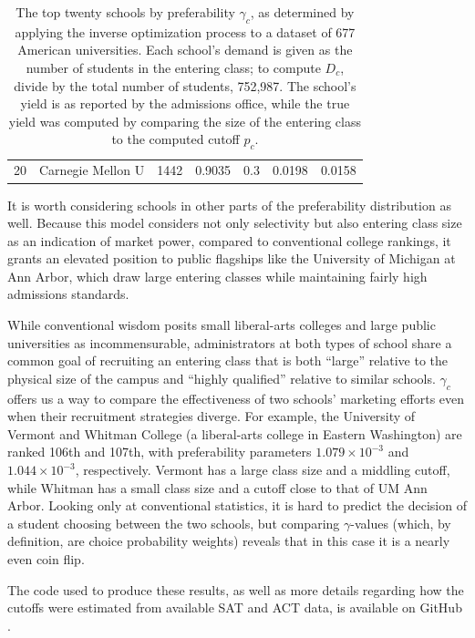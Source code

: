 \documentclass[12pt]{article}
\theoremstyle{definition}
\begin{document}
\begin{table}[]
\begin{tabular}{r|l|r|l|l|l|l}
20                                 & Carnegie Mellon U                     & 1442                                 & 0.9035                  & 0.3            & 0.0198              & 0.0158                             
\end{tabular}
\caption{\label{tab:US-inverse-optimization}
The top twenty schools by preferability $\gamma_c$, as determined by applying the inverse optimization process to a dataset of 677 American universities. Each school's demand is given as the number of students in the entering class; to compute $D_c$, divide by the total number of students, 752,987. The school's yield is as reported by the admissions office, while the true yield was computed by comparing the size of the entering class to the computed cutoff $p_c$.}
\end{table}





It is worth considering schools in other parts of the preferability distribution as well. Because this model considers not only selectivity but also entering class size as an indication of market power, compared to conventional college rankings, it grants an elevated position to public flagships like the University of Michigan at Ann Arbor, which draw large entering classes while maintaining fairly high admissions standards.

While conventional wisdom posits small liberal-arts colleges and large public universities as incommensurable, administrators at both types of school share a common goal of recruiting an entering class that is both ``large'' relative to the physical size of the campus and ``highly qualified'' relative to similar schools. $\gamma_c$ offers us a way to compare the effectiveness of two schools' marketing efforts even when their recruitment strategies diverge. For example, the University of Vermont and Whitman College (a liberal-arts college in Eastern Washington) are ranked 106th and 107th, with preferability parameters $1.079 \times 10^{-3}$ and $1.044 \times 10^{-3}$, respectively. Vermont has a large class size and a middling cutoff, while Whitman has a small class size and a cutoff close to that of UM Ann Arbor. Looking only at conventional statistics, it is hard to predict the decision of a student choosing between the two schools, but comparing $\gamma$-values (which, by definition, are choice probability weights) reveals that in this case it is a nearly even coin flip.

The code used to produce these results, as well as more details regarding how the cutoffs were estimated from available SAT and ACT data, is available on GitHub \parencite[][]{studentprefsrevopt}.
\end{document}
